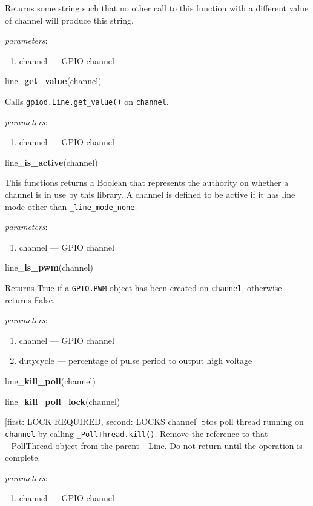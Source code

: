 \documentclass[12pt]{article}
\begin{document}
Returns some string such that no other call to this function with a different value of channel will produce this string.

\textit{parameters}:
\begin{enumerate}      
        \item channel --- GPIO channel
\end{enumerate}

\noindent line\_\textbf{get\_value}(channel)

Calls \texttt{gpiod.Line.get\_value()} on \texttt{channel}.

\textit{parameters}:
\begin{enumerate}      
        \item channel --- GPIO channel
\end{enumerate}


\noindent line\_\textbf{is\_active}(channel)

This functions returns a Boolean that represents the authority on whether a channel is in use by this library. A channel is defined to be active if it has line mode other than \texttt{\_line\_mode\_none}.

\textit{parameters}:
\begin{enumerate}      
        \item channel --- GPIO channel
\end{enumerate}

\noindent line\_\textbf{is\_pwm}(channel)

Returns True if a \texttt{GPIO.PWM} object has been created on \texttt{channel}, otherwise returns False.

\textit{parameters}:
\begin{enumerate}      
        \item channel --- GPIO channel
        \item dutycycle --- percentage of pulse period to output high voltage
\end{enumerate}

\noindent line\_\textbf{kill\_poll}(channel)

\noindent line\_\textbf{kill\_poll\_lock}(channel)

[first: LOCK REQUIRED, second: LOCKS channel]
Stos poll thread running on \texttt{channel} by calling \texttt{\_PollThread.kill()}. Remove the reference to that \_PollThread object from the parent \_Line. Do not return until the operation is complete.


\textit{parameters}:
\begin{enumerate}      
        \item channel --- GPIO channel
\end{enumerate}
\end{document}
